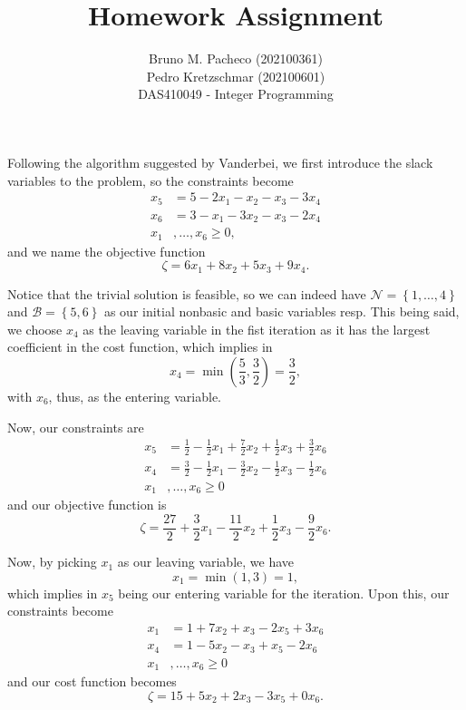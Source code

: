 \documentclass[a4paper]{report}
\begin{document}
 
\title{Homework Assignment}
\author{Bruno M. Pacheco (202100361) \\ Pedro Kretzschmar (202100601) \\
DAS410049 - Integer Programming}
 
\maketitle
 

Following the algorithm suggested by Vanderbei, we first introduce the slack variables to the problem, so the constraints become
\begin{align*}
    x_5 &= 5 - 2x_1 - x_2 - x_3 - 3x_4 \\
    x_6 &= 3 - x_1 - 3x_2 - x_3 - 2x_4  \\
    x_1&,\ldots,x_6 \ge 0
,\end{align*}
and we name the objective function \[
\zeta = 6x_1 + 8x_2 + 5x_3 + 9x_4
.\] 

Notice that the trivial solution is feasible, so we can indeed have $\mathcal{N}=\left\{ 1,\ldots,4 \right\} $ and $\mathcal{B} = \left\{ 5,6 \right\} $ as our initial nonbasic and basic variables resp. This being said, we choose $x_4$ as the leaving variable in the fist iteration as it has the largest coefficient in the cost function, which implies in \[
x_4 = \min \left( \frac{5}{3}, \frac{3}{2} \right) = \frac{3}{2}
,\] with $x_6$, thus, as the entering variable.

Now, our constraints are
\begin{align*}
    x_5 &= \frac{1}{2} - \frac{1}{2}x_1 + \frac{7}{2}x_2 + \frac{1}{2}x_3 + \frac{3}{2}x_6 \\
    x_4 &= \frac{3}{2} - \frac{1}{2}x_1 - \frac{3}{2}x_2 - \frac{1}{2}x_3 - \frac{1}{2}x_6  \\
    x_1&,\ldots,x_6 \ge 0
\end{align*}
and our objective function is \[
\zeta = \frac{27}{2} + \frac{3}{2}x_1 - \frac{11}{2}x_2 +\frac{1}{2}x_3 - \frac{9}{2}x_6
.\] 

Now, by picking $x_1$ as our leaving variable, we have \[
x_1 = \min\left( 1, 3 \right) = 1
,\] which implies in $x_5$ being our entering variable for the iteration. Upon this, our constraints become
\begin{align*}
    x_1 &= 1 + 7x_2 + x_3 -2x_5 + 3x_6 \\
    x_4 &= 1 - 5x_2 - x_3 +x_5 -2x_6  \\
    x_1&,\ldots,x_6 \ge 0
\end{align*}
and our cost function becomes \[
\zeta = 15 + 5x_2 + 2x_3 -3x_5 + 0x_6
.\] 
\end{document}
